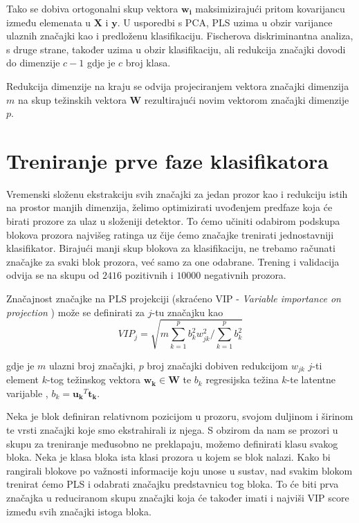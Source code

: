 \documentclass[seminar]{fer}
\begin{document}
Tako se dobiva ortogonalni skup vektora $\mathbf{w_i}$ maksimizirajući pritom kovarijancu između elemenata u $\mathbf{X}$ i $\mathbf{y}$. U usporedbi s PCA, PLS uzima u obzir varijance ulaznih značajki kao i predloženu klasifikaciju. Fischerova diskriminantna analiza, s druge strane, također uzima u obzir klasifikaciju, ali redukcija značajki dovodi do dimenzije $c - 1$ gdje je $c$ broj klasa. 

Redukcija dimenzije na kraju se odvija projeciranjem vektora značajki dimenzija $m$ na skup težinskih vektora $\mathbf{W}$ rezultirajući novim vektorom značajki dimenzije $p$.

\section{Treniranje prve faze klasifikatora}
Vremenski složenu ekstrakciju svih značajki za jedan prozor kao i redukciju istih na prostor manjih dimenzija, želimo optimizirati uvođenjem predfaze koja će birati prozore za ulaz u složeniji detektor. To ćemo učiniti odabirom podskupa blokova prozora najvišeg ratinga uz čije ćemo značajke trenirati jednostavniji klasifikator. Birajući manji skup blokova za klasifikaciju, ne trebamo  računati značajke za svaki blok prozora, već samo za one odabrane. Trening i validacija odvija se na skupu od $2416$ pozitivnih i $10000$ negativnih prozora.

Značajnost značajke na  PLS projekciji (skraćeno VIP - \emph{Variable importance on projection} ) \cite{VIP} može se definirati za $j$-tu značajku kao
\begin{equation*}
VIP_j = \sqrt{m \sum_{k = 1}^{p} b_k^2 w_{jk} ^ 2 / \sum_{k = 1}^{p} b_k ^2}
\end{equation*}

gdje je $m$ ulazni broj značajki, $p$ broj značajki dobiven redukcijom $w_{jk}$ $j$-ti element $k$-tog težinskog vektora $\mathbf{w_k} \in \mathbf{W}$ te $b_k$  regresijska težina  $k$-te latentne varijable \cite{pls}, $b_k = \mathbf{u_k}^T \mathbf{t_k}$.

Neka je blok definiran relativnom pozicijom u prozoru, svojom duljinom i širinom te vrsti značajki koje smo ekstrahirali iz njega. S obzirom da nam se prozori u skupu za treniranje međusobno ne preklapaju, možemo definirati klasu svakog bloka. Neka je klasa bloka ista klasi prozora u kojem se blok nalazi. Kako bi rangirali blokove po važnosti informacije koju unose u sustav, nad svakim blokom trenirat ćemo PLS i odabrati značajku predstavnicu tog bloka. To će biti prva značajka u reduciranom skupu značajki koja će također imati i najviši VIP score između svih značajki istoga bloka.
\end{document}
